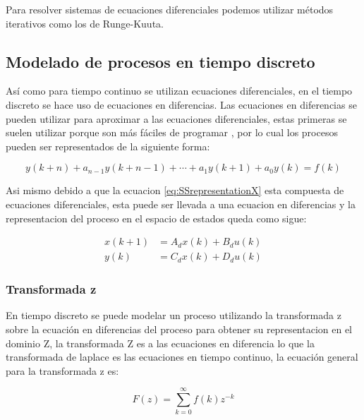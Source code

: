             Para resolver sistemas de ecuaciones diferenciales podemos utilizar métodos iterativos como los de Runge-Kuuta.

    \subsection{Modelado de procesos en tiempo discreto}

        Así como para tiempo continuo se utilizan ecuaciones diferenciales, en el tiempo discreto se hace uso de ecuaciones en diferencias. Las ecuaciones en diferencias se pueden utilizar para aproximar a las ecuaciones diferenciales, estas primeras se suelen utilizar porque son más fáciles de programar \Parencite{kuo1996sistemas}, por lo cual los procesos pueden ser representados de la siguiente forma:
        
        \begin{equation}\label{eq:EqEnDiferencias}
            y(k+n) + a_{n-1}y(k+n-1) + \cdots + a_1 y(k+1) + a_0 y(k) = f(k) 
        \end{equation}
        
        Asi mismo debido a que la ecuacion \cref{eq:SSrepresentationX} esta compuesta de ecuaciones diferenciales, esta puede ser llevada a una ecuacion en diferencias y la representacion del proceso en el espacio de estados queda como sigue:

        \begin{align}\label{eq:SSdiscreto}
            x(k+1) &= A_d x(k) + B_d u(k) \\
            y(k) &= C_d x(k) + D_d u(k)
        \end{align}

        \subsubsection{Transformada z}
		
			En tiempo discreto se puede modelar un proceso utilizando la transformada z sobre la ecuación en diferencias del proceso para obtener su representacion en el dominio Z, la transformada Z es a las ecuaciones en diferencia lo que la transformada de laplace es las ecuaciones en tiempo continuo, la ecuación general para la transformada z es:
			
			\begin{equation}\label{eq:Ztransform}
				F(z)= \sum\limits_{k=0}^{\infty}f(k)z^{-k}
			\end{equation}

